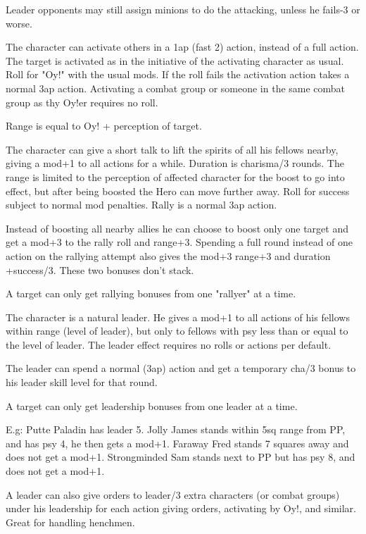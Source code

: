 Leader opponents may still assign minions to do the attacking, unless he fails-3 or worse.


 The character can activate others in a 1ap (fast 2) action, instead of a full action. The target is activated as in the initiative of the activating character as usual.
Roll for "Oy!" with the usual mods.
If the roll fails the activation action takes a normal 3ap action. Activating a combat group or someone in the same combat group as thy Oy!er requires no roll.

Range is equal to Oy! + perception of target.


 The character can give a short talk to lift the spirits of all his fellows nearby, giving a mod+1 to all actions for a while. Duration is charisma/3 rounds. The range is limited to the perception of affected character for the boost to go into effect, but after being boosted the Hero can move further away. Roll for success subject to normal mod penalties. Rally is a normal 3ap action.

Instead of boosting all nearby allies he can choose to boost only one target and get a mod+3 to the rally roll and range+3. Spending a full round instead of one action on the rallying attempt also gives the mod+3 range+3 and duration +success/3. These two bonuses don't stack.

A target can only get rallying bonuses from one "rallyer" at a time.


 The character is a natural leader. He gives a mod+1 to all actions of his fellows within range (level of leader), but only to fellows with psy less than or equal to the level of leader. The leader effect requires no rolls or actions per default.

The leader can spend a normal (3ap) action and get a temporary cha/3 bonus to his leader skill level for that round.

A target can only get leadership bonuses from one leader at a time.

E.g: Putte Paladin has leader 5. Jolly James stands within 5sq range from PP, and has psy 4, he then gets a mod+1. Faraway Fred stands 7 squares away and does not get a mod+1. Strongminded Sam stands next to PP but has psy 8, and does not get a mod+1.

A leader can also give orders to leader/3 extra characters (or combat groups) under his leadership for each action giving orders, activating by Oy!, and similar. Great for handling henchmen.


